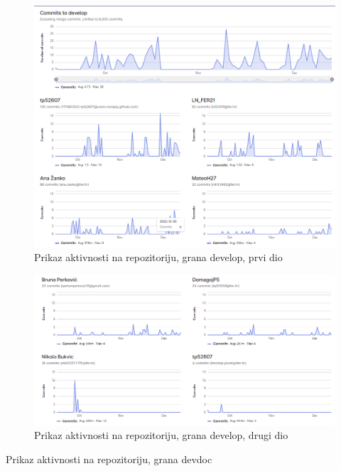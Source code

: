          \begin{figure}[H]
			    \includegraphics[width=\textwidth]{slike/commitsDevelop.jpg} 
			        \caption{Prikaz aktivnosti na repozitoriju, grana develop, prvi dio}
		\end{figure}
         \begin{figure}[H]
			    \includegraphics[width=\textwidth]{slike/commitsDevelop2.jpg} 
			        \caption{Prikaz aktivnosti na repozitoriju, grana develop, drugi dio}
		\end{figure}

        \text Prikaz aktivnosti na repozitoriju, grana devdoc


